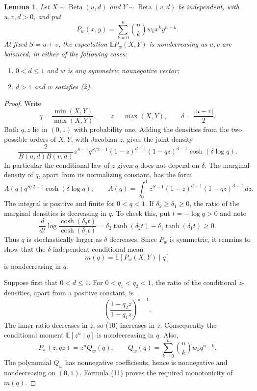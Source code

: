 \documentclass[10pt]{article}
\newtheorem{lemma}[theorem]{Lemma}
\newcommand{\E}{\mathbb E}
\newcommand{\Be}{\operatorname{Beta}}
\begin{document}
\begin{lemma}\label{beta}
Let \(X\sim\Be(u,d)\) and \(Y\sim\Be(v,d)\) be independent, with
\(u,v,d>0\), and put
\[
 P_w(x,y)=\sum_{k=0}^n\binom nk w_kx^ky^{n-k}.
 \tag{5}
\]
At fixed \(S=u+v\), the expectation \(\E P_w(X,Y)\) is nondecreasing
as \(u,v\) are balanced, in either of the following cases:
\begin{enumerate}
\item \(0<d\le1\) and \(w\) is any symmetric nonnegative vector;
\item \(d>1\) and \(w\) satisfies (2).
\end{enumerate}
\end{lemma}
\begin{proof}
Write
\[
 q=\frac{\min(X,Y)}{\max(X,Y)},\qquad z=\max(X,Y),\qquad
 \delta=\frac{|u-v|}{2}.
\]
Both \(q,z\) lie in \((0,1)\) with probability one. Adding the densities
from the two possible orders of \(X,Y\), with Jacobian \(z\), gives
the joint density
\[
 \frac{2}{B(u,d)B(v,d)}
 z^{S-1}q^{S/2-1}(1-z)^{d-1}(1-qz)^{d-1}
 \cosh(\delta\log q).                              \tag{6}
\]
In particular the conditional law of \(z\) given \(q\) does not depend
on \(\delta\). The marginal density of \(q\), apart from its normalizing
constant, has the form
\[
 A(q)q^{S/2-1}\cosh(\delta\log q),\qquad
 A(q)=\int_0^1 z^{S-1}(1-z)^{d-1}(1-qz)^{d-1}\,dz.  \tag{7}
\]
The integral is positive and finite for \(0<q<1\).
If \(\delta_2\ge\delta_1\ge0\), the ratio of the marginal densities
is decreasing in \(q\). To check this, put \(t=-\log q>0\) and note
\[
 \frac{d}{dt}\log\frac{\cosh(\delta_2t)}{\cosh(\delta_1t)}
 =\delta_2\tanh(\delta_2t)-\delta_1\tanh(\delta_1t)\ge0.
 \tag{8}
\]
Thus \(q\) is stochastically larger as \(\delta\) decreases.
Since \(P_w\) is symmetric, it remains to show that the
\(\delta\)-independent conditional mean
\[
 m(q)=\E[P_w(X,Y)\mid q]
 \tag{9}
\]
is nondecreasing in \(q\).

Suppose first that \(0<d\le1\). For \(0<q_1<q_2<1\), the ratio
of the conditional \(z\)-densities, apart from a positive constant, is
\[
 \left(\frac{1-q_2z}{1-q_1z}\right)^{d-1}.           \tag{10}
\]
The inner ratio decreases in \(z\), so (10) increases in \(z\).
Consequently the conditional moment \(\E[z^n\mid q]\) is nondecreasing
in \(q\). Also,
\[
 P_w(z,qz)=z^nQ_w(q),\qquad
 Q_w(q)=\sum_{k=0}^n\binom nk w_kq^{n-k}.
 \tag{11}
\]
The polynomial \(Q_w\) has nonnegative coefficients, hence is nonnegative
and nondecreasing on \((0,1)\). Formula (11) proves the required
monotonicity of \(m(q)\).


\end{proof}
\end{document}
